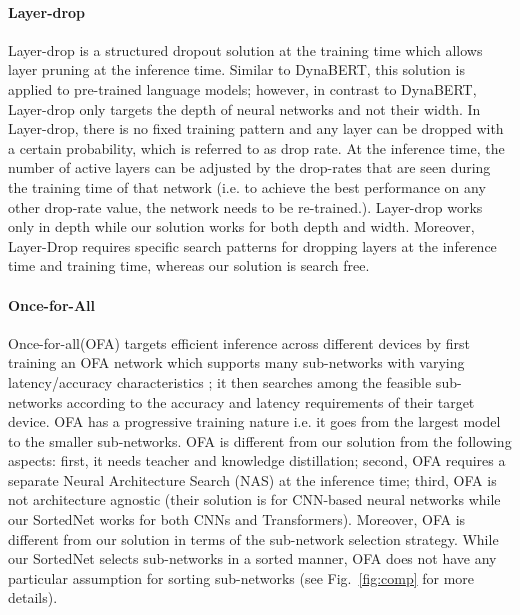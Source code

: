 \documentclass[letterpaper]{article} %
\begin{document}
\paragraph{Layer-drop~\cite{fan2019reducing}} 
Layer-drop is a structured dropout solution at the training time which allows layer pruning at the inference time. Similar to DynaBERT, this solution is applied to pre-trained language models; however, in contrast to DynaBERT, Layer-drop only targets the depth of neural networks and not their width. 
In Layer-drop, there is no fixed training pattern and any layer can be dropped with a certain probability, which is referred to as drop rate. At the inference time, the number of active layers can be adjusted by the drop-rates that are seen during the training time of that network (i.e. to achieve the best performance on any other drop-rate value, the network needs to be re-trained.). Layer-drop works only in depth while our solution works for both depth and width. Moreover, Layer-Drop requires specific search patterns for dropping layers at the inference time and training time, whereas our solution is search free. %
 

\paragraph{Once-for-All~\cite{cai_once-for-all_2020}}
Once-for-all(OFA) targets efficient inference across different devices by first training an OFA network which supports many sub-networks with varying latency/accuracy characteristics ; it then searches among the feasible sub-networks according to the accuracy and latency requirements of their target device. OFA has a progressive training nature i.e. it goes from the largest model to the smaller sub-networks. OFA is different from our solution from the following aspects: first, it needs teacher and knowledge distillation; second, OFA requires a separate Neural Architecture Search (NAS) at the inference time; third, OFA is not architecture agnostic (their solution is for CNN-based neural networks while our SortedNet works for both CNNs and Transformers). Moreover, OFA is different from our solution in terms of the sub-network selection strategy. While our SortedNet selects sub-networks in a sorted manner, OFA does not have any particular assumption for sorting sub-networks (see Fig.~\ref{fig:comp} for more details).   
\end{document}
